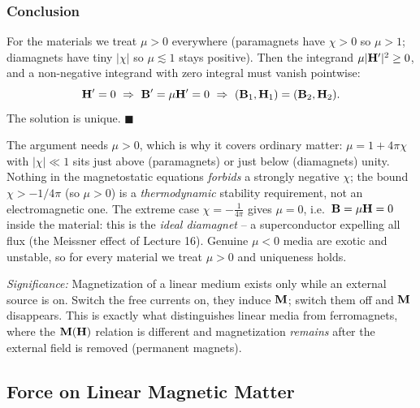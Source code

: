 \subsubsection*{Conclusion}
For the materials we treat $\mu>0$ everywhere (paramagnets have $\chi>0$ so $\mu>1$;
diamagnets have tiny $|\chi|$ so $\mu\lesssim1$ stays positive). Then the integrand
$\mu|\mathbf{H}'|^2\ge0$, and a non-negative integrand with zero integral must vanish
pointwise:
\begin{equation}\label{eq:lec18-Hprime-zero}
  \mathbf{H}'=0\ \Rightarrow\ \mathbf{B}'=\mu\mathbf{H}'=0
  \ \Rightarrow\ (\mathbf{B}_1,\mathbf{H}_1)=(\mathbf{B}_2,\mathbf{H}_2).
\end{equation}
The solution is unique. $\blacksquare$

\begin{remark}
The argument needs $\mu>0$, which is why it covers ordinary matter:
$\mu=1+4\pi\chi$ with $|\chi|\ll1$ sits just above (paramagnets) or just below
(diamagnets) unity. Nothing in the magnetostatic equations \emph{forbids} a strongly
negative $\chi$; the bound $\chi>-1/4\pi$ (so $\mu>0$) is a \emph{thermodynamic}
stability requirement, not an electromagnetic one. The extreme case
$\chi=-\tfrac{1}{4\pi}$ gives $\mu=0$, i.e.\ $\mathbf{B}=\mu\mathbf{H}=0$ inside the material: this is
the \emph{ideal diamagnet} -- a superconductor expelling all flux (the Meissner effect of
Lecture 16). Genuine $\mu<0$ media are exotic and unstable, so for every material we treat
$\mu>0$ and uniqueness holds.
\end{remark}

\textit{Significance:} Magnetization of a linear medium exists only while an external
source is on. Switch the free currents on, they induce $\mathbf{M}$; switch them off and
$\mathbf{M}$ disappears. This is exactly what distinguishes linear media from ferromagnets,
where the $\mathbf{M}(\mathbf{H})$ relation is different and magnetization \emph{remains} after
the external field is removed (permanent magnets).

\subsection{Force on Linear Magnetic Matter}\label{subsec:lec18-force}


